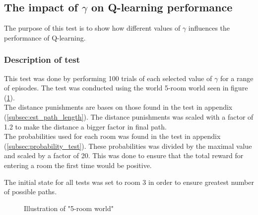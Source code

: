 \documentclass[../Head/Main.tex]{subfiles}
\begin{document}
\subsection{The impact of $\gamma$ on Q-learning performance}
\label{subsec:test_gamma}
The purpose of this test is to show how different values of $\gamma$ influences the performance of Q-learning.
\subsubsection*{Description of test}
This test was done by performing 100 trials of each selected value of $\gamma$ for a range of episodes. The test was conducted using the world 5-room world seen in figure (\ref{fig:5_room_world_gamma}).\\
The distance punishments are bases on those found in the test in appendix (\ref{subsec:est_path_length}). The distance punishments was scaled with a factor of 1.2 to make the distance a bigger factor in final path.\\
The probabilities used for each room was found in the test in appendix (\ref{subsec:probability_test}). These probabilities was divided by the maximal value and scaled by a factor of 20. This was done to ensure that the total reward for entering a room the first time would be positive.\par 
The initial state for all tests was set to room 3 in order to ensure greatest number of possible paths.

\begin{figure}[H]
	\centering
		
	\caption{Illustration of "5-room world"}
	\label{fig:5_room_world_gamma}
\end{figure}
\end{document}
